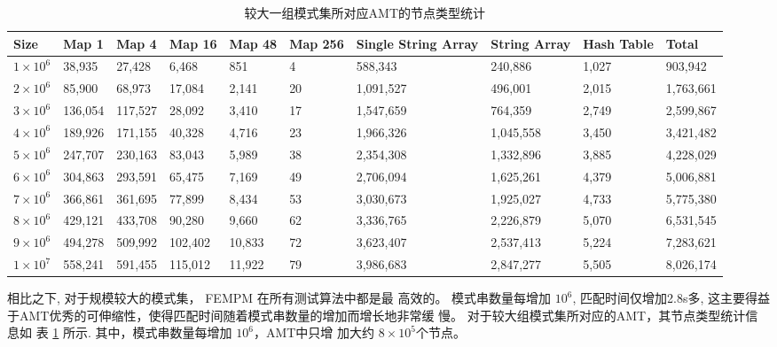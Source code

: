 \begin{table}[!htp]
  \caption{较大一组模式集所对应AMT的节点类型统计}
  \scriptsize
  \label{tab:large_group}
  \begin{tabular}{p{25pt}p{25pt}p{25pt}p{25pt}p{20pt}p{10pt}p{30pt}p{30pt}p{20pt}p{25pt}}
 \hline
 Size &
 Map 1 &
 Map 4 &
 Map 16 &
 Map 48 &
 Map 256 &
 Single String Array &
 String Array   &
 Hash Table &
 Total\\
\hline
$1 \times 10^6$ &  38,935 &   27,428  &   6,468 &     851   &    4 &    588,343  &    240,886 &  1,027 &    903,942  \\
$2 \times 10^6$ &  85,900 &   68,973  &  17,084 &   2,141   &   20 &  1,091,527  &    496,001 &  2,015 &  1,763,661  \\
$3 \times 10^6$ & 136,054 &  117,527  &  28,092 &   3,410   &   17 &  1,547,659  &    764,359 &  2,749 &  2,599,867  \\
$4 \times 10^6$ & 189,926 &  171,155  &  40,328 &   4,716   &   23 &  1,966,326  &  1,045,558 &  3,450 &  3,421,482  \\
$5 \times 10^6$ & 247,707 &  230,163  &  83,043 &   5,989   &  38 &  2,354,308   &  1,332,896 &  3,885 &  4,228,029  \\
$6 \times 10^6$ & 304,863 &  293,591  &  65,475 &   7,169   &   49 &  2,706,094  &  1,625,261 &  4,379 &  5,006,881  \\
$7 \times 10^6$ & 366,861 &  361,695  &  77,899 &   8,434   &   53 &  3,030,673  &  1,925,027 &  4,733 &  5,775,380  \\
$8 \times 10^6$ & 429,121 &  433,708  &  90,280 &   9,660   &   62 &  3,336,765  &  2,226,879 &  5,070 &  6,531,545  \\
$9 \times 10^6$ & 494,278 &  509,992  & 102,402 &  10,833   &   72 &  3,623,407  &  2,537,413 &  5,224 &  7,283,621  \\
$1 \times 10^7$ & 558,241 &  591,455  & 115,012 &  11,922   &   79 &  3,986,683  &  2,847,277 &  5,505 &  8,026,174  \\
\hline
\end{tabular}
\end{table}

相比之下, 对于规模较大的模式集， \textsf{FEMPM} 在所有测试算法中都是最
高效的。 模式串数量每增加 $10^6$, 匹配时间仅增加2.8s多, 这主要得益
于AMT优秀的可伸缩性，使得匹配时间随着模式串数量的增加而增长地非常缓
慢。 对于较大组模式集所对应的AMT，其节点类型统计信息如
表 \ref{tab:large_group} 所示. 其中，模式串数量每增加 $10^6$，AMT中只增
加大约 $8 \times 10^5$个节点。


